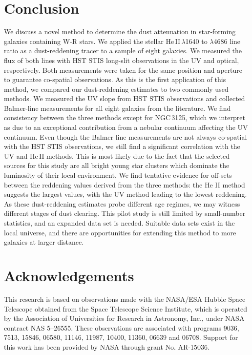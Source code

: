 \documentclass[]{aastex63}
\begin{document}
\section{Conclusion}\label{sect:conclusion}
We discuss a novel method to determine the dust attenuation in star-forming galaxies containing W-R stars. We applied the stellar He\,II\,$\lambda$1640 to $\lambda$4686 line ratio as a dust-reddening tracer to a sample of eight galaxies. We measured the flux of both lines with HST STIS long-slit observations in the UV and optical, respectively. Both measurements were taken for the same position and aperture to guarantee co-spatial observations. 
As this is the first application of this method, we compared our dust-reddening estimates to two commonly used methods. We measured the UV slope from HST STIS observations and collected Balmer-line measurements for all eight galaxies from the literature.
We find consistency between the three methods except for NGC\,3125, which we interpret as due to an exceptional contribution from a nebular continuum affecting the UV continuum. Even though the Balmer line measurements are not always co-spatial with the HST STIS observations, we still find a significant correlation with the UV and He\,II methods. This is most likely due to the fact that the selected sources for this study are all bright young star clusters which dominate the luminosity of their local environment. We find tentative evidence for off-sets between the reddening values derived from the three methods: the He II method suggests the largest values, with the UV method leading to the lowest reddening. As these dust-reddening estimates probe different age regimes, we may witness different stages of dust clearing. This pilot study is still limited by small-number statistics, and an expanded data set is needed. Suitable data sets exist in the local universe, and there are opportunities for extending this method to more galaxies at larger distance.


\section*{Acknowledgements}
This research is based on observations made with the NASA/ESA Hubble Space Telescope obtained from the Space Telescope Science Institute, which is operated by the Association of Universities for Research in Astronomy, Inc., under NASA contract NAS 5–26555. These observations are associated with programs  9036, 7513, 15846, 06580, 11146, 11987, 10400, 11360, 06639 and 06708. 
Support for this work has been provided by NASA through grant No. AR-15036.
\end{document}

